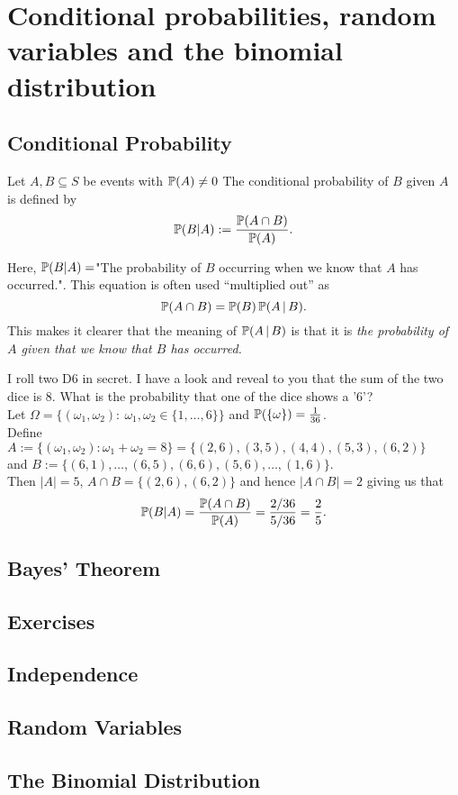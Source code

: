 \section{Conditional probabilities, random variables and the binomial distribution}

\subsection{Conditional Probability}
\begin{defn}
Let $A, B \subseteq S$ be events with ${\mathbb P}(A) \not=0$ The conditional probability of $B$ given $A$ is defined by
\[{\mathbb P}(B \vert A) := \frac{{\mathbb P}(A \cap B)}{{\mathbb P}(A)}.\]
\end{defn}
\noindent Here, ${\mathbb P}( B \vert A)=$"The probability of $B$ occurring when we know that $A$ has occurred.". This equation is often used ``multiplied out'' as
\[{\mathbb P}(A \cap B) = {\mathbb P}(B) \, {\mathbb P}(A \, | \, B). \]
This makes it clearer that the meaning of ${\mathbb P}(A \, | \, B)$ is that it is \emph{the probability of $A$ given that we know that $B$ has occurred.}
\begin{example}
I roll two D6 in secret. I have a look and reveal to you that the sum of the two dice is $8$. What is the probability that one of the dice shows a '$6$'?\\ \linebreak
Let $\Omega = \{ (\omega_1,\omega_2):\ \omega_1,\omega_2 \in \{1, \ldots, 6 \}\}$ and ${\mathbb P}(\{\omega\}) = \frac{1}{36}$.\\ \linebreak
Define $A:=\{ (\omega_1,\omega_2): \omega_1+ \omega_2 = 8 \} = \{ (2,6),(3,5), (4,4), (5,3), (6,2)\}$\\ and $B:=\{ (6,1),\ldots,(6,5),(6,6),(5,6),\ldots,(1,6) \}$.\\ \linebreak
Then $\vert A \vert =5$, $A \cap B= \{ (2,6),(6,2)\}$ and hence $\vert A \cap B \vert = 2$ giving us that
\[ {\mathbb P}(B \vert A) = \frac{{\mathbb P}(A \cap B)}{{\mathbb P}(A)} = \frac{ 2/36}{5/36} = \frac25.\]
\end{example}
\subsection{Bayes' Theorem}

\subsection{Exercises}

\subsection{Independence}

\subsection{Random Variables}

\subsection{The Binomial Distribution}